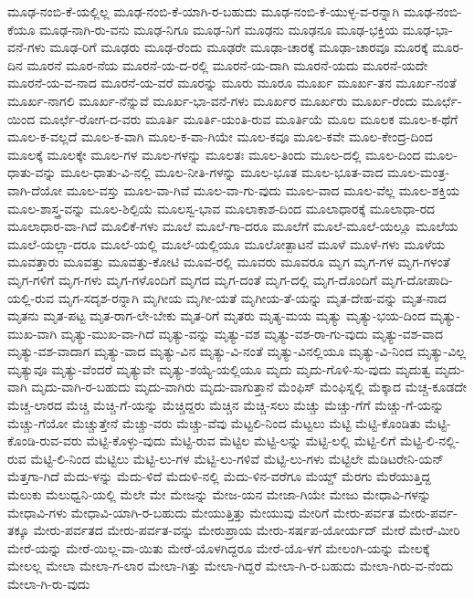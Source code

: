 {ಮೂಢ-ನಂಬಿ-ಕೆ-ಯಲ್ಲಿಲ್ಲ
ಮೂಢ-ನಂಬಿ-ಕೆ-ಯಾಗಿ-ರ-ಬಹುದು
ಮೂಢ-ನಂಬಿ-ಕೆ-ಯುಳ್ಳ-ವ-ರನ್ನಾಗಿ
ಮೂಢ-ನಂಬಿ-ಕೆಯೂ
ಮೂಢ-ನಾಗಿ-ರು-ವನು
ಮೂಢ-ನಿಗೂ
ಮೂಢ-ನಿಗೆ
ಮೂಢನು
ಮೂಢನೂ
ಮೂಢ-ಭಕ್ತಿಯ
ಮೂಢ-ಭಾ-ವನೆ-ಗಳು
ಮೂಢ-ರಿಗೆ
ಮೂಢರು
ಮೂಢ-ರೆಂದು
ಮೂಢರೇ
ಮೂಢಾ-ಚಾರಕ್ಕೆ
ಮೂಢಾ-ಚಾರವೂ
ಮೂರಕ್ಕೆ
ಮೂರ-ದಿನ
ಮೂರನೆ
ಮೂರ-ನೆಯ
ಮೂರನೆ-ಯ-ದ-ರಲ್ಲಿ
ಮೂರನೆ-ಯ-ದಾಗಿ
ಮೂರನೆ-ಯದು
ಮೂರನೆ-ಯದೇ
ಮೂರನೆ-ಯ-ವ-ನಾದ
ಮೂರನೆ-ಯ-ವರೆ
ಮೂರನ್ನು
ಮೂರು
ಮೂರೂ
ಮೂರ್ಖ
ಮೂರ್ಖ-ತನ
ಮೂರ್ಖ-ನಂತೆ
ಮೂರ್ಖ-ನಾಗಲಿ
ಮೂರ್ಖ-ನೆನ್ನುವೆ
ಮೂರ್ಖ-ಭಾ-ವನೆ-ಗಳು
ಮೂರ್ಖರ
ಮೂರ್ಖರು
ಮೂರ್ಖ-ರೆಂದು
ಮೂರ್ಛೆ-ಯಿಂದ
ಮೂರ್ಛೆ-ರೋಗ-ದ-ವರು
ಮೂರ್ತಿ
ಮೂರ್ತಿ-ಯಂತಿ-ರುವ
ಮೂರ್ತಿಯೆ
ಮೂಲ
ಮೂಲಕ
ಮೂಲ-ಕ-ಥೆಗೆ
ಮೂಲ-ಕ-ವಲ್ಲದೆ
ಮೂಲ-ಕ-ವಾಗಿ
ಮೂಲ-ಕ-ವಾ-ಗಿಯೇ
ಮೂಲ-ಕವೂ
ಮೂಲ-ಕವೇ
ಮೂಲ-ಕೇಂದ್ರ-ದಿಂದ
ಮೂಲಕ್ಕೆ
ಮೂಲಕ್ಕೇ
ಮೂಲ-ಗಳ
ಮೂಲ-ಗಳನ್ನು
ಮೂಲತಃ
ಮೂಲ-ತಿಂದು
ಮೂಲ-ದಲ್ಲಿ
ಮೂಲ-ದಿಂದ
ಮೂಲ-ಧಾತು-ವನ್ನು
ಮೂಲ-ಧಾತು-ವಿ-ನಲ್ಲಿ
ಮೂಲ-ನೀತಿ-ಗಳನ್ನು
ಮೂಲ-ಭೂತ
ಮೂಲ-ಭೂತ-ವಾದ
ಮೂಲ-ಮಂತ್ರ-ವಾಗಿ-ದೆಯೋ
ಮೂಲ-ವಸ್ತು
ಮೂಲ-ವಾ-ಗಿವೆ
ಮೂಲ-ವಾ-ಗು-ವುದು
ಮೂಲ-ವಾದ
ಮೂಲ-ವೆಲ್ಲ
ಮೂಲ-ಶಕ್ತಿಯ
ಮೂಲ-ಶಾಸ್ತ್ರ-ವನ್ನು
ಮೂಲ-ಶಿಲ್ಪಿಯೆ
ಮೂಲಸ್ವ-ಭಾವ
ಮೂಲಾಕಾಶ-ದಿಂದ
ಮೂಲಾಧಾರಕ್ಕೆ
ಮೂಲಾಧಾ-ರದ
ಮೂಲಾಧಾರ-ವಾ-ಗಿದೆ
ಮೂಲಿಕೆ-ಗಳು
ಮೂಲೆ
ಮೂಲೆ-ಗಾ-ದರೂ
ಮೂಲೆಗೆ
ಮೂಲೆ-ಮೂಲೆ-ಯಲ್ಲೂ
ಮೂಲೆಯ
ಮೂಲೆ-ಯಲ್ಲಾ-ದರೂ
ಮೂಲೆ-ಯಲ್ಲಿ
ಮೂಲೆ-ಯಲ್ಲಿಯೂ
ಮೂಲೋತ್ಪಾಟನೆ
ಮೂಳೆ
ಮೂಳೆ-ಗಳು
ಮೂಳೆಯ
ಮೂವತ್ತಾರು
ಮೂವತ್ತು
ಮೂವತ್ತು-ಕೋಟಿ
ಮೂವ-ರಲ್ಲಿ
ಮೂವರು
ಮೂವರೂ
ಮೃಗ
ಮೃಗ-ಗಳ
ಮೃಗ-ಗಳಂತೆ
ಮೃಗ-ಗಳಿಗೆ
ಮೃಗ-ಗಳು
ಮೃಗ-ಗಳೊಂದಿಗೆ
ಮೃಗದ
ಮೃಗ-ದಂತೆ
ಮೃಗ-ದಲ್ಲಿ
ಮೃಗ-ದೊಂದಿಗೆ
ಮೃಗ-ದೋಪಾದಿ-ಯಲ್ಲಿ-ರುವ
ಮೃಗ-ಸದೃಶ-ರನ್ನಾಗಿ
ಮೃಗೀಯ
ಮೃಗೀ-ಯತೆ
ಮೃಗೀಯ-ತೆ-ಯನ್ನು
ಮೃತ-ದೇಹ-ವನ್ನು
ಮೃತ-ನಾದ
ಮೃತನು
ಮೃತ-ಪಟ್ಟ
ಮೃತ-ರಾಗ-ಲೇ-ಬೇಕು
ಮೃತ-ರಿಗೆ
ಮೃತರು
ಮೃತ್ಯ-ಮಯ
ಮೃತ್ಯು
ಮೃತ್ಯು-ಭಯ-ದಿಂದ
ಮೃತ್ಯು-ಮುಖ-ವಾಗಿ
ಮೃತ್ಯು-ಮುಖ-ವಾ-ಗಿದೆ
ಮೃತ್ಯು-ವನ್ನು
ಮೃತ್ಯು-ವಶ
ಮೃತ್ಯು-ವಶ-ರಾ-ಗು-ವುದು
ಮೃತ್ಯು-ವಶ-ವಾದ
ಮೃತ್ಯು-ವಶ-ವಾದಾಗ
ಮೃತ್ಯು-ವಾದ
ಮೃತ್ಯು-ವಿನ
ಮೃತ್ಯು-ವಿ-ನಂತೆ
ಮೃತ್ಯು-ವಿನಲ್ಲಿಯೂ
ಮೃತ್ಯು-ವಿ-ನಿಂದ
ಮೃತ್ಯು-ವಿಲ್ಲ
ಮೃತ್ಯುವೂ
ಮೃತ್ಯು-ವೆಂದರೆ
ಮೃತ್ಯುವೇ
ಮೃತ್ಯು-ಶಯ್ಯೆ-ಯಲ್ಲಿಯೂ
ಮೃದು
ಮೃದು-ಗೊಳಿ-ಸು-ವುದು
ಮೃದುತ್ವ
ಮೃದು-ವಾಗಿ
ಮೃದು-ವಾಗಿ-ರ-ಬಹುದು
ಮೃದು-ವಾಗಿರು
ಮೃದು-ವಾಗುತ್ತಾನೆ
ಮೆಂಫಿಸ್
ಮೆಂಫಿಸ್ನಲ್ಲಿ
ಮೆಕ್ಕಾದ
ಮೆಚ್ಚ-ಕೂಡದೇ
ಮೆಚ್ಚ-ಲಾರದ
ಮೆಚ್ಚಿ
ಮೆಚ್ಚಿ-ಗೆ-ಯನ್ನು
ಮೆಚ್ಚಿದ್ದರು
ಮೆಚ್ಚಿನ
ಮೆಚ್ಚಿ-ಸಲು
ಮೆಚ್ಚು
ಮೆಚ್ಚು-ಗೆಗೆ
ಮೆಚ್ಚು-ಗೆ-ಯನ್ನು
ಮೆಚ್ಚು-ಗೆಯೋ
ಮೆಚ್ಚುತ್ತೇನೆ
ಮೆಚ್ಚು-ವರು
ಮೆಚ್ಚು-ವೆವು
ಮೆಟ್ಟಲಿ-ನಿಂದ
ಮೆಟ್ಟಲು
ಮೆಟ್ಟಿ
ಮೆಟ್ಟಿ-ಕೊಂಡಿತು
ಮೆಟ್ಟಿ-ಕೊಂಡಿ-ರುವ-ವರು
ಮೆಟ್ಟಿ-ಕೊಳ್ಳು-ವುದು
ಮೆಟ್ಟಿ-ರುವ
ಮೆಟ್ಟಿಲ
ಮೆಟ್ಟಿ-ಲನ್ನು
ಮೆಟ್ಟಿ-ಲಲ್ಲಿ
ಮೆಟ್ಟಿ-ಲಿಗೆ
ಮೆಟ್ಟಿ-ಲಿ-ನಲ್ಲಿ-ರುವ
ಮೆಟ್ಟಿ-ಲಿ-ನಿಂದ
ಮೆಟ್ಟಿಲು
ಮೆಟ್ಟಿ-ಲು-ಗಳ
ಮೆಟ್ಟಿ-ಲು-ಗಳಿವೆ
ಮೆಟ್ಟಿ-ಲು-ಗಳು
ಮೆಟ್ಟಿಲೇ
ಮೆಡಿಟರೇನಿ-ಯನ್
ಮೆತ್ತಗಾ-ಗಿದೆ
ಮೆದು-ಳನ್ನು
ಮೆದು-ಳಿದೆ
ಮೆದುಳಿ-ನಲ್ಲಿ
ಮೆದು-ಳಿನ-ವರೆಗೂ
ಮೆಯ್ಡ್
ಮೆರಗು
ಮೆರೆಯುತ್ತಿದ್ದ
ಮೆಲುಕು
ಮೆಲುಧ್ವನಿ-ಯಲ್ಲಿ
ಮೆಲೇ
ಮೇ
ಮೇಜನ್ನು
ಮೇಜ-ಯನ
ಮೇಜಾ-ಗಿಯೇ
ಮೇಜು
ಮೇಧಾವಿ-ಗಳನ್ನು
ಮೇಧಾವಿ-ಗಳು
ಮೇಧಾವಿ-ಯಾಗಿ-ರ-ಬಹುದು
ಮೇಯುತ್ತಿತ್ತು
ಮೇಯುವು
ಮೇರಿಗೆ
ಮೇರು-ಪರ್ವತ
ಮೇರು-ಪರ್ವ-ತಕ್ಕೂ
ಮೇರು-ಪರ್ವತದ
ಮೇರು-ಪರ್ವತ-ವನ್ನು
ಮೇರುಪ್ರಾಯ
ಮೇರು-ಸರ್ಷಪ-ಯೋರ್ಯದ್
ಮೇರೆ
ಮೇರೆ-ಮೀರಿ
ಮೇರೆ-ಯನ್ನು
ಮೇರೆ-ಯಿಲ್ಲ-ವಾ-ಯಿತು
ಮೇರೆ-ಯೊಳಗಿದ್ದರೂ
ಮೇರೆ-ಯೊ-ಳಗೆ
ಮೇಲಂಗಿ-ಯನ್ನು
ಮೇಲಕ್ಕೆ
ಮೇಲಲ್ಲ
ಮೇಲಾ
ಮೇಲಾ-ಗ-ಲಾರ
ಮೇಲಾ-ಗಿತ್ತು
ಮೇಲಾ-ಗಿದ್ದರೆ
ಮೇಲಾ-ಗಿ-ರ-ಬಹುದು
ಮೇಲಾ-ಗಿರು-ವ-ನೆಂದು
ಮೇಲಾ-ಗಿ-ರು-ವುದು
}
